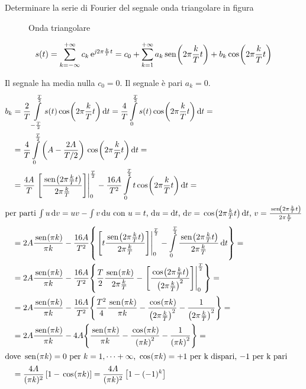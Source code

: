 \begin{esercizio}
Determinare la serie di Fourier del segnale onda triangolare in figura
\begin{figure}[h!]
\begin{center}
\end{center}
\caption{Onda triangolare}\label{fig:onda_triangolare}
\end{figure}

\[s(t)=\sum_{k=-\infty}^{+\infty}{c_k \operatorname{e}^{\operatorname{\mathit{j}\!} 2\pi\frac{k}{T}t}} =c_0+\sum_{k=1}^{+\infty}{a_k\,{\operatorname{sen}}^{}\!\left({2\pi\frac{k}{T}t}\right)+b_k\,{\operatorname{cos}}^{}\!\left({2\pi\frac{k}{T}t}\right)}\]

Il segnale ha media nulla $c_0=0$. Il segnale è pari $a_k=0$.
\[\begin{split}b_k&=\frac{2}{T}\intd{-\frac{T}{2}}{\frac{T}{2}}{s(t)\cos{2\pi\frac{k}{T}t}}{t}=\frac{4}{T}\intd{0}{\frac{T}{2}}{s(t)\cos{2\pi\frac{k}{T}t}}{t}=\\
&=\frac{4}{T}\intd{0}{\frac{T}{2}}{\left(A-\frac{2 A}{T/2}\right)\cos{2\pi\frac{k}{T}t}}{t}=\\
&=\frac{4A}{T}\bound{0}{\frac{T}{2}}{\frac{\sen{2\pi\frac{k}{T}t}}{2\pi\frac{k}{T}}} -\frac{16A}{T^2}\intd{0}{\frac{T}{2}}{t\cos{2\pi\frac{k}{T}t}}{t}=\\
\intertext{per parti $\int u\diff v= u v-\int v\diff u$ con $u=t$, $\diff u=\diff t$, $\diff v=\cos{2\pi\frac{k}{T}t}\diff t$, $v=\frac{\sen{2\pi\frac{k}{T}t}}{2\pi\frac{k}{T}}$}
&=2A \frac{\sen{\pi k}}{\pi k}-\frac{16A}{T^2}{\left\lbrace \bound{0}{\frac{T}{2}}{t\frac{\sen{2\pi\frac{k}{T}t}}{2\pi\frac{k}{T}}}-\intd{0}{\frac{T}{2}}{\frac{\sen{2\pi\frac{k}{T}t}}{2\pi\frac{k}{T}}}{t}\right\rbrace}=\\
&=2A \frac{\sen{\pi k}}{\pi k}-\frac{16A}{T^2}{\left\lbrace\frac{T}{2}\frac{\sen{\pi k}}{2\pi\frac{k}{T}}-\bound{0}{\frac{T}{2}}{\frac{\cos{2\pi\frac{k}{T}t}}{\left(2\pi\frac{k}{T}\right)^2}}\right\rbrace}=\\
&=2A \frac{\sen{\pi k}}{\pi k}-\frac{16A}{T^2}{\left\lbrace\frac{T^2}{4}\frac{\sen{\pi k}}{\pi k}-\frac{\cos{\pi k}}{\left(2\pi\frac{k}{T}\right)^2}-\frac{1}{\left(2\pi\frac{k}{T}\right)^2}\right\rbrace}=\\
&=2A \frac{\sen{\pi k}}{\pi k}-4A{\left\lbrace\frac{\sen{\pi k}}{\pi k}-\frac{\cos{\pi k}}{\left(\pi k\right)^2}-\frac{1}{\left(\pi k\right)^2}\right\rbrace}=\\
\intertext{dove $\sen{\pi k}=0$ per $k=1,\dots+\infty$, $\cos{\pi k}=+1$ per k dispari, $-1$ per k pari}
&=\frac{4A}{(\pi k)^2}\left[1-\cos{\pi k}\right] = \frac{4A}{(\pi k)^2}\left[1-(-1)^k\right]
\end{split}\]
\end{esercizio}

